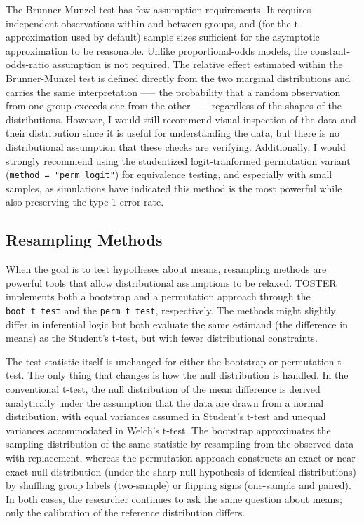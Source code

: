 \documentclass[]{interact}
\theoremstyle{plain}%
\theoremstyle{definition}
\theoremstyle{remark}
\begin{document}
The Brunner-Munzel test has few assumption requirements. It requires
independent observations within and between groups, and (for the
t-approximation used by default) sample sizes sufficient for the
asymptotic approximation to be reasonable. Unlike proportional-odds
models, the constant-odds-ratio assumption is not required. The relative
effect estimated within the Brunner-Munzel test is defined directly from
the two marginal distributions and carries the same interpretation -----
the probability that a random observation from one group exceeds one
from the other ----- regardless of the shapes of the distributions.
However, I would still recommend visual inspection of the data and their
distribution since it is useful for understanding the data, but there is
no distributional assumption that these checks are verifying.
Additionally, I would strongly recommend using the studentized
logit-tranformed permutation variant (\texttt{method\ =\ "perm\_logit"})
for equivalence testing, and especially with small samples, as
simulations have indicated this method is the most powerful while also
preserving the type 1 error rate.

\newpage

\subsection{Resampling Methods}\label{resampling-methods}

When the goal is to test hypotheses about means, resampling methods are
powerful tools that allow distributional assumptions to be relaxed.
TOSTER implements both a bootstrap and a permutation approach through
the \texttt{boot\_t\_test} and the \texttt{perm\_t\_test}, respectively.
The methods might slightly differ in inferential logic but both evaluate
the same estimand (the difference in means) as the Student's t-test, but
with fewer distributional constraints.

The test statistic itself is unchanged for either the bootstrap or
permutation t-test. The only thing that changes is how the null
distribution is handled. In the conventional t-test, the null
distribution of the mean difference is derived analytically under the
assumption that the data are drawn from a normal distribution, with
equal variances assumed in Student's t-test and unequal variances
accommodated in Welch's t-test. The bootstrap approximates the sampling
distribution of the same statistic by resampling from the observed data
with replacement, whereas the permutation approach constructs an exact
or near-exact null distribution (under the sharp null hypothesis of
identical distributions) by shuffling group labels (two-sample) or
flipping signs (one-sample and paired). In both cases, the researcher
continues to ask the same question about means; only the calibration of
the reference distribution differs.
\end{document}
